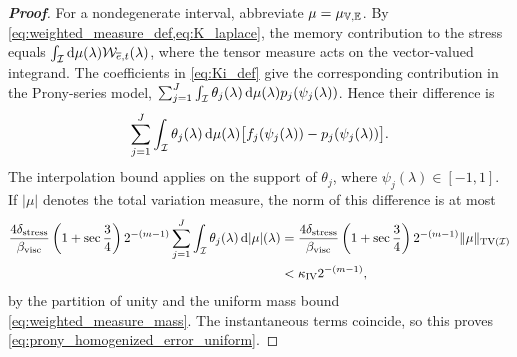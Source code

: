 {\begin{proof}[\bf Proof]
For a nondegenerate interval, abbreviate $\mu=\mu_{\mathbb{V},\mathbb{E}}$. By \cref{eq:weighted_measure_def,eq:K_laplace}, the memory contribution to the stress equals $\int_{{\mathcal{I}}}\mathrm d\mu(\lambda){\mathcal{W}}_{\overline e,t}(\lambda)$, where the tensor measure acts on the vector-valued integrand. The coefficients in \cref{eq:Ki_def} give the corresponding contribution in the Prony-series model, $\sum_{j=1}^J\int_{{\mathcal{I}}}\theta_j(\lambda)\,\mathrm d\mu(\lambda)p_j(\psi_j(\lambda))$. Hence their difference is
\begin{equation*}
\sum_{j=1}^J\int_{{\mathcal{I}}}\theta_j(\lambda)\,\mathrm d\mu(\lambda)\bigl[f_j(\psi_j(\lambda))-p_j(\psi_j(\lambda))\bigr].
\end{equation*}
The interpolation bound applies on the support of $\theta_j$, where $\psi_j(\lambda)\in[-1,1]$. If $|\mu|$ denotes the total variation measure, the norm of this difference is at most
\begin{align*}
\frac{4\delta_{\rm stress}}{\beta_{\rm visc}}\left(1+\sec\frac34\right)2^{-(m-1)}\sum_{j=1}^J\int_{{\mathcal{I}}}\theta_j(\lambda)\,\mathrm d|\mu|(\lambda)
&=\frac{4\delta_{\rm stress}}{\beta_{\rm visc}}\left(1+\sec\frac34\right)2^{-(m-1)}\|\mu\|_{\mathrm{TV}({\mathcal{I}})}\\
&<\kappa_{\rm IV}2^{-(m-1)},
\end{align*}
by the partition of unity and the uniform mass bound \cref{eq:weighted_measure_mass}. The instantaneous terms coincide, so this proves \cref{eq:prony_homogenized_error_uniform}.
\end{proof}

}

